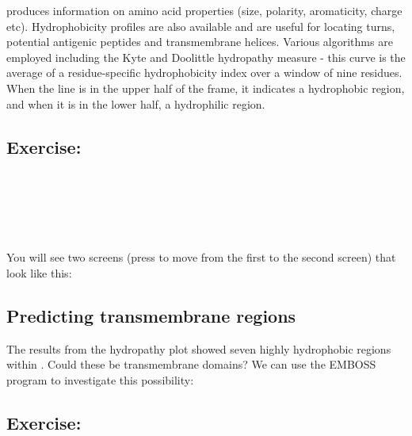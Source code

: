 \documentclass[12pt]{report}
\begin{document}
 produces information on amino acid properties (size, polarity, aromaticity, charge
etc). Hydrophobicity profiles are also available and are useful for
locating turns, potential antigenic peptides and transmembrane
helices. Various algorithms are employed including the Kyte and
Doolittle hydropathy measure - this curve is the average of a
residue-specific hydrophobicity index over a window of nine residues.
When the line is in the upper half of the frame, it indicates a
hydrophobic region, and when it is in the lower half, a hydrophilic
region.

\subsection*{Exercise: }

\unix{}\\
\\
\\
\\
\\
You will see two screens (press  to move from the first
to the second screen) that look like this:

\begin{figure}[H]
\begin{center}
\end{center}
\label{fig:pepinfo1}
\end{figure}

\begin{figure}[H]
\begin{center}
\end{center}
\label{fig:pepinfo2}
\end{figure}


\subsection{Predicting transmembrane regions}

The results from the  hydropathy plot showed seven
highly hydrophobic regions within . Could these be
transmembrane domains? We can use the EMBOSS program 
to investigate this possibility:

\subsection*{Exercise: }
\end{document}
